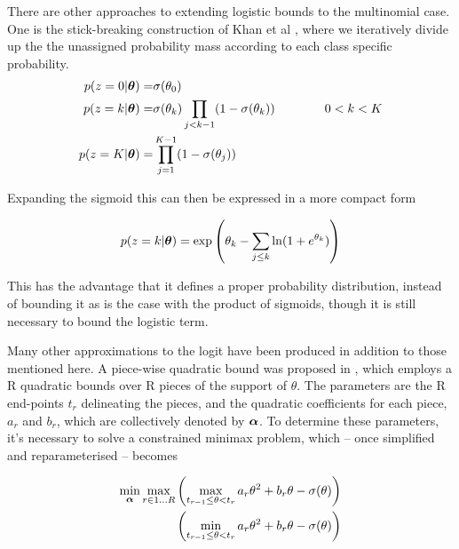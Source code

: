 \newcommand \C { \mathcal{C} }

There are other approaches to extending logistic bounds to the multinomial case. One is the stick-breaking construction of Khan et al \cite{Khan2012stick}, where we iteratively divide up the the unassigned probability mass according to each class specific probability.
\begin{align}
\begin{split}
p(z = 0 | \bm \theta) = & \sigma(\theta_0) \\
p(z = k | \bm \theta) = & \sigma(\theta_k) \prod_{j < k - 1} (1 - \sigma(\theta_k)) \qquad\qquad 0 < k < K \\
p (z = K | \bm \theta) = & \prod_{j = 1}^{K - 1} (1 - \sigma(\theta_j))
\end{split}
\end{align}

Expanding the sigmoid this can then be expressed in a more compact form

\begin{equation}
p(z = k | \bm \theta) = \exp \left( \theta_k - \sum_{j \leq k} \ln (1 + e^{\theta_k}) \right)
\end{equation}

This has the advantage that it defines a proper probability distribution, instead of bounding it as is the case with the product of sigmoids, though it is still necessary to bound the logistic term.

Many other approximations to the logit have been produced in addition to those mentioned here. A piece-wise quadratic bound was proposed in \cite{Marlin2011}, which employs a R quadratic bounds over R pieces of the support of $\theta$. The parameters are the R end-points $t_r$ delineating the pieces, and the quadratic coefficients for each piece, $a_r$ and $b_r$, which are collectively denoted by $\bm \alpha$. To determine these parameters, it's necessary to solve a constrained minimax problem, which -- once simplified and reparameterised -- becomes 

\begin{align}
\begin{split}
\min_{\bm \alpha} \max_{r \in {1 \ldots R}}
 & \left(  \max_{t_{r-1} \leq \theta < t_r} a_r \theta^2 + b_r \theta - \sigma(\theta) \right) \\
 & \left(  \min_{t_{r-1} \leq \theta < t_r} a_r \theta^2 + b_r \theta - \sigma(\theta)  \right)
\end{split}
\end{align}

